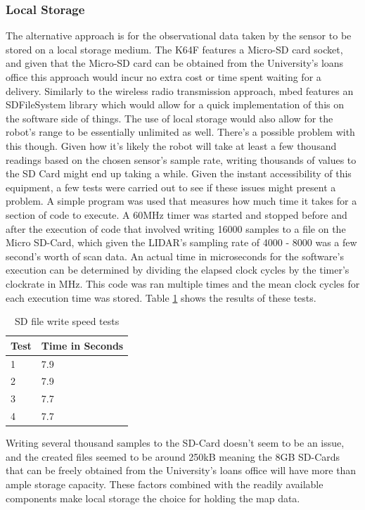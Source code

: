 					\subsubsection{Local Storage}
					The alternative approach is for the observational data taken by the sensor to be stored on a local storage medium. The K64F features a Micro-SD card socket, and given that the Micro-SD card can be obtained from the University's loans office this approach would incur no extra cost or time spent waiting for a delivery. Similarly to the wireless radio transmission approach, mbed features an SDFileSystem library\citep{sdfilesystemlibrary} which would allow for a quick implementation of this on the software side of things. The use of local storage would also allow for the robot's range to be essentially unlimited as well. There's a possible problem with this though. Given how it's likely the robot will take at least a few thousand readings based on the chosen sensor's sample rate, writing thousands of values to the SD Card might end up taking a while. Given the instant accessibility of this equipment, a few tests were carried out to see if these issues might present a problem. A simple program was used that measures how much time it takes for a section of code to execute. A 60MHz timer was started and stopped before and after the execution of code that involved writing 16000 samples to a file on the Micro SD-Card, which given the LIDAR's sampling rate of 4000 - 8000 was a few second's worth of scan data. An actual time in microseconds for the software's execution can be determined by dividing the elapsed clock cycles by the timer's clockrate in MHz. This code was ran multiple times and the mean clock cycles for each execution time was stored. Table \ref{table:filewritetests} shows the results of these tests.
					
					\begin{table}[h!]
						\centering
						\begin{tabular}{|| l | l ||} 
							\hline
							Test & Time in Seconds \\ [0.5ex] 
							\hline
							1 & 7.9 \\ 
							2 & 7.9 \\
							3 & 7.7 \\
							4 & 7.7 \\ [1ex] 
							\hline
						\end{tabular}
						\caption{SD file write speed tests}
						\label{table:filewritetests}		
					\end{table}
					Writing several thousand samples to the SD-Card doesn't seem to be an issue, and the created files seemed to be around 250kB meaning the 8GB SD-Cards that can be freely obtained from the University's loans office will have more than ample storage capacity. These factors combined with the readily available components make local storage the choice for holding the map data.
				
